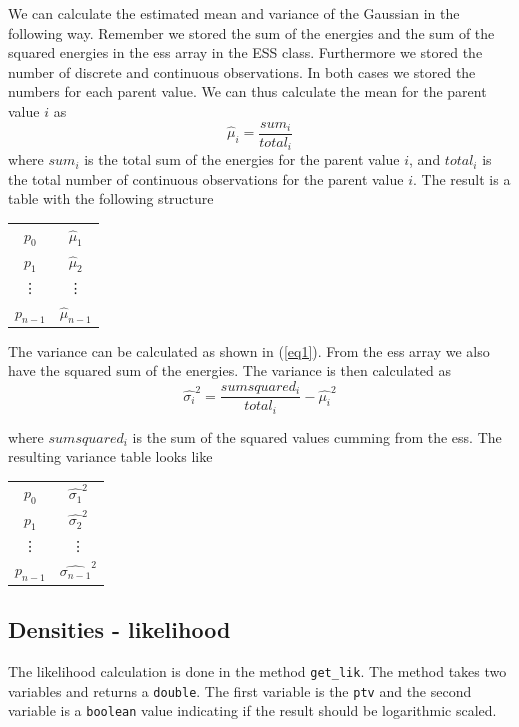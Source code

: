 \documentclass[10pt, journal, compsoc, a4paper]{IEEEtran}
\begin{document}
We can calculate the estimated mean and variance of the Gaussian in the following way. Remember we stored the sum of the energies and the sum of the squared energies in the ess array in the ESS class. Furthermore we stored the number of discrete and continuous observations. In both cases we stored the numbers for each parent value. We can thus calculate the mean for the parent value $i$ as
\begin{equation}
  \hat{\mu}_i = \frac{sum_i}{total_i} 
\end{equation}
where $sum_i$ is the total sum of the energies for the parent value $i$, and $total_i$ is the total number of continuous observations for the parent value $i$. The result is a table with the following structure
\begin{center}
  \begin{tabular}{c | c }
  $p_0$ & $\hat{\mu}_1$ \\
  $p_1$ & $\hat{\mu}_2$ \\
  \vdots & \vdots \\
  $p_{n-1}$ & $\hat{\mu}_{n-1}$  
  \end{tabular}  
\end{center}


The variance can be calculated as shown in (\ref{eq1}). From the ess array we also have the squared sum of the energies. The variance is then calculated as
\begin{equation}
  \hat{\sigma_i}^2 = \frac{sumsquared_i}{total_i} - \hat{\mu_i}^2
\end{equation}

where $sumsquared_i$ is the sum of the squared values cumming from the ess. The resulting variance table looks like
\begin{center}
  \begin{tabular}{c | c }
  $p_0$ & $\hat{\sigma_1}^2$ \\
  $p_1$ & $\hat{\sigma_2}^2$ \\
  \vdots & \vdots \\
  $p_{n-1}$ & $\hat{\sigma_{n-1}}^2$  
  \end{tabular}  
\end{center}


\subsection{Densities - likelihood} %
\label{sub:densities_likelihood}
The likelihood calculation is done in the method \texttt{get\_lik}. The method takes two variables and returns a \texttt{double}. The first variable is the \texttt{ptv} and the second variable is a \texttt{boolean} value indicating if the result should be logarithmic scaled.
\end{document}
